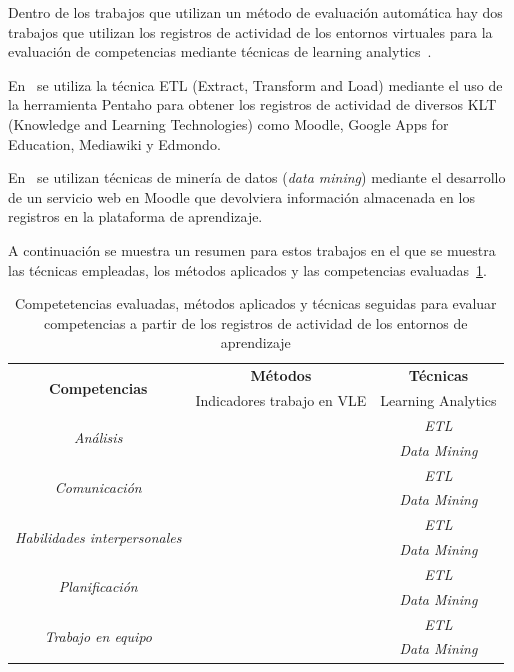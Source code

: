 
Dentro de los trabajos que utilizan un método de evaluación automática hay dos trabajos que utilizan los registros de actividad de los entornos virtuales para la evaluación de competencias mediante técnicas de learning analytics~\cite{rayon2014web,fidalgo:2015}. 

En~\cite{rayon2014web} se utiliza la técnica ETL (Extract, Transform and Load) mediante el uso de la herramienta Pentaho para obtener los registros de actividad de diversos KLT (Knowledge and Learning Technologies) como Moodle, Google Apps for Education, Mediawiki y Edmondo.

En~\cite{fidalgo:2015} se utilizan técnicas de minería de datos (\emph{data mining}) mediante el desarrollo de un servicio web en Moodle que devolviera información almacenada en los registros en la plataforma de aprendizaje.

A continuación se muestra un resumen para estos trabajos en el que se muestra las técnicas empleadas, los métodos aplicados y las competencias evaluadas~\ref{tab:CompetenciasMetodosTecnicas}.

\begin{table}
  \begin{center}
  \begin{tabular}{| c | c | c |}
    \hline
     \multirow{2}{*}{\textbf{Competencias}} & \textbf{Métodos} &\textbf{Técnicas} \\
    \cline{2-3}
     &  Indicadores trabajo en VLE & Learning Analytics \\
    \hline
    \hline
    \multirow{2}{*}{\emph{Análisis}} & \cite{rayon2014web} & \emph{ETL}  \\
    \cline{2-3}
     &  & \emph{Data Mining} \\
    \hline
    \multirow{2}{*}{\emph{Comunicación}} & \cite{rayon2014web} & \emph{ETL} \\
    \cline{2-3}
     &  & \emph{Data Mining} \\
    \hline
    \multirow{2}{*}{\emph{Habilidades interpersonales}} & \cite{rayon2014web} & \emph{ETL} \\
    \cline{2-3}
     &  & \emph{Data Mining} \\
    \hline
    \multirow{2}{*}{\emph{Planificación}} & \cite{rayon2014web} & \emph{ETL} \\
    \cline{2-3}
     &  & \emph{Data Mining} \\
    \hline
    \multirow{2}{*}{\emph{Trabajo en equipo}} & \cite{rayon2014web} & \emph{ETL} \\
    \cline{2-3}
     & \cite{fidalgo:2015} & \emph{Data Mining} \\
    \hline
  \end{tabular}
\end{center}
\caption{Competetencias evaluadas, métodos aplicados y técnicas seguidas para evaluar competencias a partir de los registros de actividad de los entornos de aprendizaje}
\label{tab:CompetenciasMetodosTecnicas}
\end{table}



